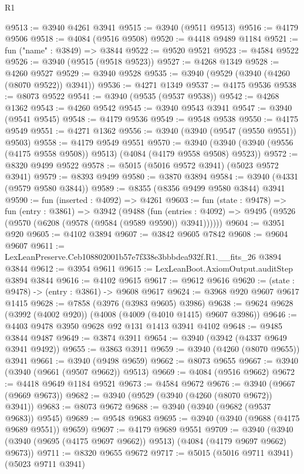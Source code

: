 \begin{lexlean}{R1}
\begin{coremodule}
@9513 := @3940 @4261 @3941
@9515 := @3940 (@9511 @9513)
@9516 := @4179 @9506
@9518 := @4084 (@9516 @9508)
@9520 := @4418 @9489 @1184
@9521 := fun ("name" : @3849) => @3844
@9522 := @9520 @9521
@9523 := @4584 @9522
@9526 := @3940 (@9515 (@9518 @9523))
@9527 := @4268 @1349
@9528 := @4260 @9527
@9529 := @3940 @9528
@9535 := @3940 (@9529 (@3940 (@4260 (@8070 @9522)) @3941))
@9536 := @4271 @1349
@9537 := @4175 @9536
@9538 := @8073 @9522
@9541 := @3940 (@9535 (@9537 @9538))
@9542 := @4268 @1362
@9543 := @4260 @9542
@9545 := @3940 @9543 @3941
@9547 := @3940 (@9541 @9545)
@9548 := @4179 @9536
@9549 := @9548 @9538
@9550 := @4175 @9549
@9551 := @4271 @1362
@9556 := @3940 (@3940 (@9547 (@9550 @9551)) @9503)
@9558 := @4179 @9549 @9551
@9570 := @3940 (@3940 (@3940 (@9556 (@4175 @9558 @9508)) @9513) (@4084 (@4179 @9558 @9508) @9523))
@9572 := @8320 @9499 @9522
@9578 := @5015 (@5016 @9572 @3941) (@5023 @9572 @3941)
@9579 := @8393 @9499
@9580 := @3870 @3894
@9584 := @3940 (@4331 (@9579 @9580 @3844))
@9589 := @8355 (@8356 @9499 @9580 @3844) @3941
@9590 := fun (inserted : @4092) => @4261
@9603 := fun (state : @9478) =>
  fun (entry : @3861) =>
  @3942
    (@9488
      (fun (entries : @4092) => @9495 (@9526 (@9570 (@6208 (@9578 (@9584 (@9589 @9590)) @3941))))))
@9604 := @3951 @920
@9605 := @4102 @3894
@9607 := @3842 @9605 @7842
@9608 := @9604 @9607
@9611 := LexLeanPreserve.Ceb108802001b57e7f338e3bbbdea932f.R1.__fits_26 @3894 @3844
@9612 := @3954 @9611
@9615 := LexLeanBoot.AxiomOutput.auditStep @3894 @3844
@9616 := @4102 @9615
@9617 := @9612 @9616
@9620 := (state : @9478) -> (entry : @3861) -> @9608 @9617
@9624 := @3968 @920 @9607 @9617 @1415
@9628 := @7858 (@3976 (@3983 @9605) @3986)
@9638 := @9624 @9628 (@3992 (@4002 @920)) (@4008 (@4009 (@4010 @1415) @9607 @3986))
@9646 := @4403 @9478 @3950 @9628 @92 @131 @1413 @3941 @4102
@9648 := @9485 @3844 @9487
@9649 := @3874 @3911
@9654 := @3940 (@3942 (@4337 @9649 @3941 @9492))
@9655 := @3863 @3911
@9659 := @3940 (@4260 (@8070 @9655)) @3941
@9661 := @3940 (@9498 @9659)
@9662 := @8073 @9655
@9667 := @3940 (@3940 (@9661 (@9507 @9662)) @9513)
@9669 := @4084 (@9516 @9662)
@9672 := @4418 @9649 @1184 @9521
@9673 := @4584 @9672
@9676 := @3940 (@9667 (@9669 @9673))
@9682 := @3940 (@9529 (@3940 (@4260 (@8070 @9672)) @3941))
@9683 := @8073 @9672
@9688 := @3940 (@3940 (@9682 (@9537 @9683)) @9545)
@9689 := @9548 @9683
@9695 := @3940 (@3940 (@9688 (@4175 @9689 @9551)) @9659)
@9697 := @4179 @9689 @9551
@9709 := @3940 (@3940 (@3940 (@9695 (@4175 @9697 @9662)) @9513) (@4084 (@4179 @9697 @9662) @9673))
@9711 := @8320 @9655 @9672
@9717 := @5015 (@5016 @9711 @3941) (@5023 @9711 @3941)

\end{coremodule}
\end{lexlean}
